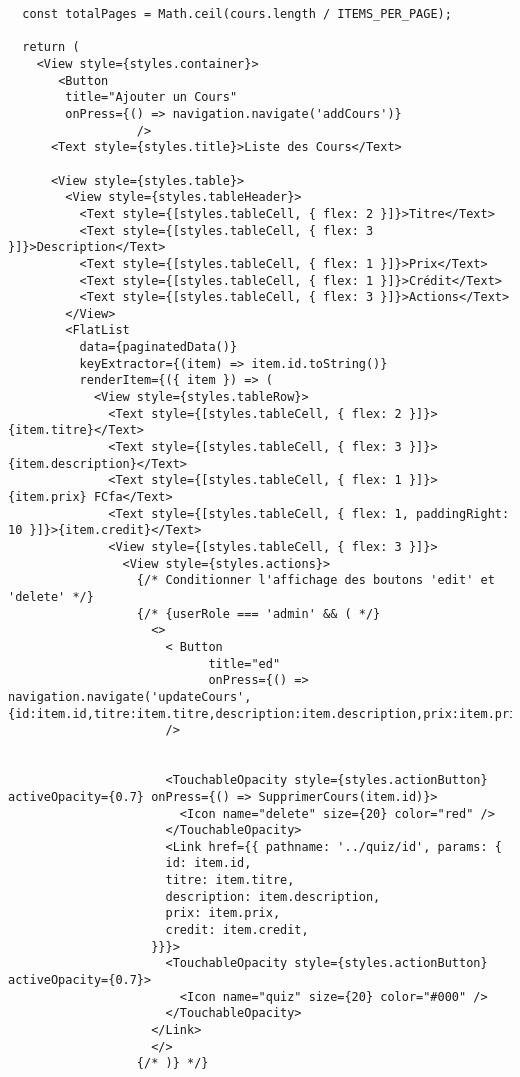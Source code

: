 \documentclass[10pt,a4paper]{article}
\begin{document}
\begin{verbatim}
  const totalPages = Math.ceil(cours.length / ITEMS_PER_PAGE);

  return (
    <View style={styles.container}>
       <Button
        title="Ajouter un Cours"
        onPress={() => navigation.navigate('addCours')}
                  /> 
      <Text style={styles.title}>Liste des Cours</Text>

      <View style={styles.table}>
        <View style={styles.tableHeader}>
          <Text style={[styles.tableCell, { flex: 2 }]}>Titre</Text>
          <Text style={[styles.tableCell, { flex: 3 }]}>Description</Text>
          <Text style={[styles.tableCell, { flex: 1 }]}>Prix</Text>
          <Text style={[styles.tableCell, { flex: 1 }]}>Crédit</Text>
          <Text style={[styles.tableCell, { flex: 3 }]}>Actions</Text>
        </View>
        <FlatList
          data={paginatedData()}
          keyExtractor={(item) => item.id.toString()}
          renderItem={({ item }) => (
            <View style={styles.tableRow}>
              <Text style={[styles.tableCell, { flex: 2 }]}>{item.titre}</Text>
              <Text style={[styles.tableCell, { flex: 3 }]}>{item.description}</Text>
              <Text style={[styles.tableCell, { flex: 1 }]}>{item.prix} FCfa</Text>
              <Text style={[styles.tableCell, { flex: 1, paddingRight: 10 }]}>{item.credit}</Text>
              <View style={[styles.tableCell, { flex: 3 }]}>
                <View style={styles.actions}>
                  {/* Conditionner l'affichage des boutons 'edit' et 'delete' */}
                  {/* {userRole === 'admin' && ( */}
                    <>
                      < Button
                            title="ed"
                            onPress={() => navigation.navigate('updateCours',{id:item.id,titre:item.titre,description:item.description,prix:item.prix,credit:item.credit})}
                      /> 
                      
                       
                      <TouchableOpacity style={styles.actionButton} activeOpacity={0.7} onPress={() => SupprimerCours(item.id)}>
                        <Icon name="delete" size={20} color="red" />
                      </TouchableOpacity>
                      <Link href={{ pathname: '../quiz/id', params: {  
                      id: item.id,
                      titre: item.titre,
                      description: item.description,
                      prix: item.prix,
                      credit: item.credit,
                    }}}>
                      <TouchableOpacity style={styles.actionButton} activeOpacity={0.7}>
                        <Icon name="quiz" size={20} color="#000" />
                      </TouchableOpacity>
                    </Link>
                    </>
                  {/* )} */}


\end{verbatim}
\end{document}
